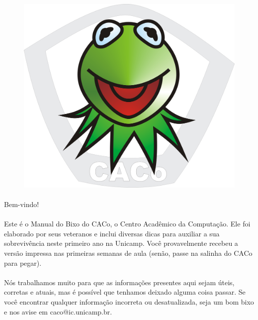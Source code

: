 \documentclass[a4paper,10pt, twocolumn, twoside, titlepage]{article}
\begin{document}
\thispagestyle{empty}

\hfill
\pagebreak[4]


\onecolumn
{}

\begin{figure}[H]
    \centering
    \includegraphics[scale=0.45,keepaspectratio=true]{img/caco-logo-grande.png}
\end{figure}

\paragraph{}
Bem-vindo!

\paragraph{}
Este é o Manual do Bixo do CACo, o Centro Acadêmico da Computação.
Ele foi elaborado por seus veteranos e inclui diversas dicas para auxiliar a sua
sobrevivência neste primeiro ano na Unicamp.
Você provavelmente recebeu a versão impressa nas primeiras semanas de aula (senão, passe na salinha do CACo para pegar).

\paragraph{}
Nós trabalhamos muito para que as informações presentes aqui sejam úteis,
corretas e atuais, mas é possível que tenhamos deixado alguma coisa passar. Se
você encontrar qualquer informação incorreta ou desatualizada, seja um bom bixo
e nos avise em caco@ic.unicamp.br.
\end{document}
